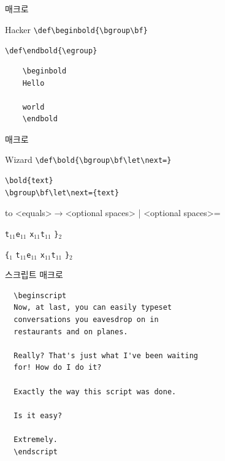 \documentclass{beamer}
\begin{document}
%
\begin{frame}[fragile]{\texttt{\string\bold} 매크로}
  \begin{alertblock}{Hacker}
    \verb+\def\beginbold{\bgroup\bf}+
    
    \verb+\def\endbold{\egroup}+
  \end{alertblock}

\begin{verbatim}
    \beginbold
    Hello

    world
    \endbold
\end{verbatim}
\end{frame}


%
\begin{frame}[fragile]{\texttt{\string\bold} 매크로}
  \begin{alertblock}{Wizard}
    \verb+\def\bold{\bgroup\bf\let\next=}+
  \end{alertblock}

\begin{verbatim}
\bold{text}
\bgroup\bf\let\next={text}
\end{verbatim}

  \hbox to
  <equals>$\rightarrow$<optional spaces> | <optional spaces>=

\bigskip

  \quad{}\quad
  \verb|t|$_{11}$\quad\verb|e|$_{11}$\quad
  \verb|x|$_{11}$\quad\verb|t|$_{11}$\quad
  \verb|}|$_{2}$

  \verb|{|$_1$\quad{}\quad
  \verb|t|$_{11}$\quad\verb|e|$_{11}$\quad
  \verb|x|$_{11}$\quad\verb|t|$_{11}$\quad
  \verb|}|$_{2}$
\end{frame}


%
\begin{frame}[fragile]{스크립트 매크로}
\begin{verbatim}
  \beginscript
  Now, at last, you can easily typeset
  conversations you eavesdrop on in
  restaurants and on planes.
  
  Really? That's just what I've been waiting
  for! How do I do it?
  
  Exactly the way this script was done.
  
  Is it easy?
  
  Extremely.
  \endscript
\end{verbatim}
\end{frame}


%
\newcount\spk
\def\beginscript{\bgroup \parindent=0pt \rm \spk=1 \rightskip.4in
  \def\par{\ifnum\spk=1 \endgraf \sl \spk=2 \leftskip.4in \rightskip0in
    \else \endgraf \rm \spk=1 \leftskip0in \rightskip.4in \fi}}
\def\endscript {\egroup}
\end{document}
